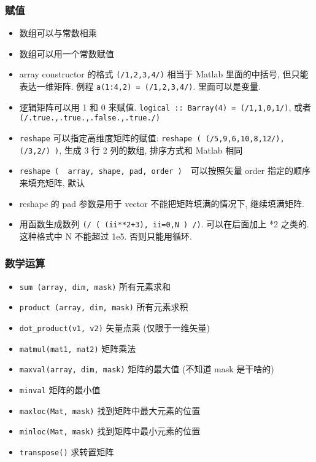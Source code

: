 \subsubsection{赋值}
\begin{itemize}
\item 数组可以与常数相乘
\item 数组可以用一个常数赋值
\item array constructor 的格式 \verb`(/1,2,3,4/)` 相当于 Matlab 里面的中括号, 但只能表达一维矩阵. 例程 \verb`a(1:4,2) = (/1,2,3,4/)`. 里面可以是变量.
\item 逻辑矩阵可以用 1 和 0 来赋值. \verb`logical :: Barray(4) = (/1,1,0,1/)`, 
   或者 \verb`(/.true.,.true.,.false.,.true./)`
\item \verb`reshape` 可以指定高维度矩阵的赋值: 
   \verb`reshape ( (/5,9,6,10,8,12/), (/3,2/) )`, 生成 3 行 2 列的数组, 排序方式和 Matlab 相同
\item \verb`reshape (  array, shape, pad, order )`　可以按照矢量 order 指定的顺序来填充矩阵, 默认
\item reshape 的 pad 参数是用于 vector 不能把矩阵填满的情况下, 继续填满矩阵.
\item 用函数生成数列  \verb`(/ ( (ii**2+3), ii=0,N ) /)`.  可以在后面加上 *2 之类的. 这种格式中 N 不能超过 1e5. 否则只能用循环.
\end{itemize}

\subsubsection{数学运算}
\begin{itemize}
\item \verb`sum (array, dim, mask)` 所有元素求和
\item \verb`product (array, dim, mask)` 所有元素求积
\item \verb`dot_product(v1, v2)` 矢量点乘 (仅限于一维矢量)
\item \verb`matmul(mat1, mat2)` 矩阵乘法
\item \verb`maxval(array, dim, mask)` 矩阵的最大值 (不知道 mask 是干啥的)
\item \verb`minval` 矩阵的最小值
\item \verb`maxloc(Mat, mask)` 找到矩阵中最大元素的位置
\item \verb`minloc(Mat, mask)` 找到矩阵中最小元素的位置
\item \verb`transpose()` 求转置矩阵
\end{itemize}

